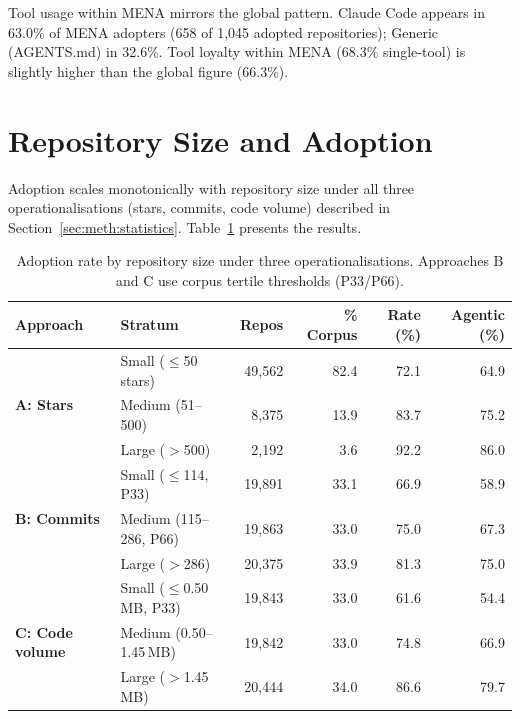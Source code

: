 Tool usage within MENA mirrors the global pattern. Claude Code appears in 63.0\% of MENA adopters (658 of 1,045 adopted repositories); Generic (AGENTS.md) in 32.6\%. Tool loyalty within MENA (68.3\% single-tool) is slightly higher than the global figure (66.3\%).

\section{Repository Size and Adoption}
\label{sec:res:size}

Adoption scales monotonically with repository size under all three operationalisations (stars, commits, code volume) described in Section~\ref{sec:meth:statistics}. Table~\ref{tab:size_comparison} presents the results.

\begin{table}[h]
\centering
\caption{Adoption rate by repository size under three operationalisations.
         Approaches B and C use corpus tertile thresholds (P33/P66).}
\label{tab:size_comparison}
\begin{tabular}{@{}llrrrr@{}}
\toprule
Approach & Stratum & Repos & \% Corpus & Rate (\%) & Agentic (\%) \\
\midrule
\multirow{3}{*}{\textbf{A: Stars}}
  & Small ($\leq$50 stars)       & 49,562 & 82.4 & 72.1 & 64.9 \\
  & Medium (51--500)             &  8,375 & 13.9 & 83.7 & 75.2 \\
  & Large ($>$500)               &  2,192 &  3.6 & 92.2 & 86.0 \\[4pt]
\multirow{3}{*}{\textbf{B: Commits}}
  & Small ($\leq$114, P33)       & 19,891 & 33.1 & 66.9 & 58.9 \\
  & Medium (115--286, P66)       & 19,863 & 33.0 & 75.0 & 67.3 \\
  & Large ($>$286)               & 20,375 & 33.9 & 81.3 & 75.0 \\[4pt]
\multirow{3}{*}{\textbf{C: Code volume}}
  & Small ($\leq$0.50\,MB, P33)  & 19,843 & 33.0 & 61.6 & 54.4 \\
  & Medium (0.50--1.45\,MB)      & 19,842 & 33.0 & 74.8 & 66.9 \\
  & Large ($>$1.45\,MB)          & 20,444 & 34.0 & 86.6 & 79.7 \\
\bottomrule
\end{tabular}
\end{table}

